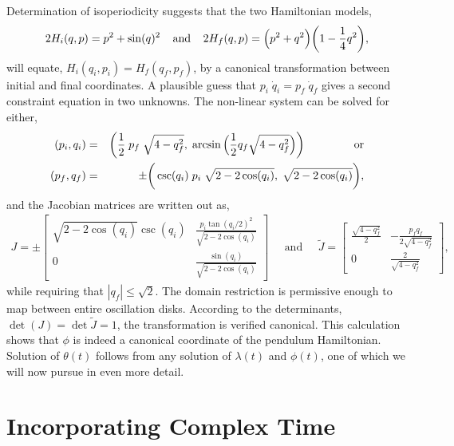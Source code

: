 \documentclass[nofootinbib,preprint]{revtex4-1}
\begin{document}
Determination of isoperiodicity suggests that the two Hamiltonian models,
\begin{eqnarray}
2H_i(q,p) = p^2 + \sin(q)^2 \text{\;\;\;\;and\;\;\;\;} 2H_f(q,p) = \Big(p^2 + q^2\Big)\bigg(1-\frac{1}{4} q^2\bigg), \nonumber 
\end{eqnarray}
will equate, $H_i(q_i,p_i)=H_f(q_f,p_f)$, by a canonical transformation between initial and final 
coordinates. A plausible guess that $p_i \;\dot{q}_i = p_f \;\dot{q}_f$ gives a second constraint 
equation in two unknowns. The non-linear system can be solved for either, 
\begin{eqnarray}
(p_i,q_i) &=& \bigg(\frac{1}{2}\;p_f\;\sqrt{4-q_f^2}, \;
\arcsin\Big(\frac{1}{2}q_f \sqrt{4-q_f^2}\Big)\bigg)
 \text{\;\;\;\;\;\;\;\;\;\;\;\;\;\;\;\;or}  \nonumber \\ 
(p_f,q_f) &=& \pm \bigg(\csc(q_i) \;p_i\; \sqrt{2-2\cos(q_i)}, \; \sqrt{2-2\cos(q_i)} \bigg), \nonumber 
\end{eqnarray}
and the Jacobian matrices are written out as,
\begin{eqnarray}
J = \pm \begin{bmatrix} \sqrt{2-2\cos(q_i)} \csc(q_i) & \frac{p_i \tan(q_i/2)^2}{\sqrt{2-2\cos(q_i)}} \\
0 &  \frac{\sin(q_i)}{\sqrt{2-2\cos(q_i)}}
\end{bmatrix}  \;\;\;\;\; \text{and}  \;\;\;\;\; 
\widetilde{J} = \begin{bmatrix} \frac{\sqrt{4-q_f^2}}{2} & -\frac{p_f q_f}{2\sqrt{4-q_f^2}} \\
0 & \frac{2}{\sqrt{4-q_f^2}} \end{bmatrix}\nonumber,
\end{eqnarray}
while requiring that $|q_f| \le \sqrt{2}$. The domain restriction is permissive enough to map 
between entire oscillation disks. According to the determinants, $\det(J)=\det{\widetilde{J}}=1$,
the transformation is verified canonical. This calculation shows that $\phi$ is indeed a 
canonical coordinate of the pendulum Hamiltonian. Solution of $\theta(t)$ follows from 
any solution of $\lambda(t)$ and $\phi(t)$, one of which we will now pursue in even 
more detail.
 

\section{Incorporating Complex Time}
\end{document}
